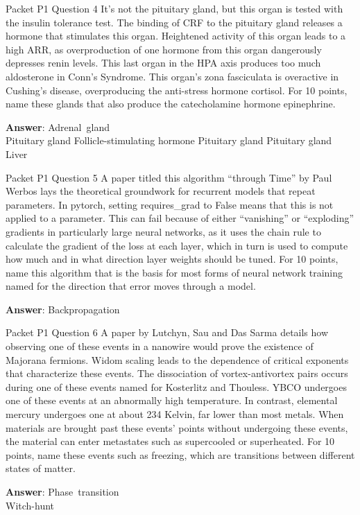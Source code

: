 \begin{frame}{Packet P1 Question 4}
It's not the pituitary gland, but this organ     is tested with the insulin tolerance test. The binding of CRF to the pituitary gland releases a hormone that stimulates this organ. Heightened activity of this organ leads to a high ARR, as overproduction of one hormone from this organ dangerously   depresses renin levels. This last organ in the HPA axis produces too much aldosterone in Conn's Syndrome. This organ's zona fasciculata   is overactive in Cushing’s disease,   overproducing the anti-stress hormone cortisol. For 10 points, name these glands that also produce the catecholamine hormone epinephrine.    

\textbf{Answer}: Adrenal\ gland\\
 Pituitary gland
 Follicle-stimulating hormone
 Pituitary gland
 Pituitary gland
 Liver
\end{frame}

\begin{frame}{Packet P1 Question 5}
A paper titled this algorithm ``through Time'' by Paul Werbos lays the theoretical groundwork for recurrent models that repeat parameters.  In pytorch, setting requires\_grad to False means that this is not applied to a parameter.  This can fail because of either ``vanishing'' or ``exploding'' gradients in particularly large neural networks, as it uses the chain rule to calculate the gradient of the loss at each layer, which     in turn is used to compute how much and in what direction layer weights should be   tuned. For 10 points, name this algorithm   that is the basis for most forms of neural network training named for the direction that error moves through a model.

\textbf{Answer}: Backpropagation\\
\end{frame}

\begin{frame}{Packet P1 Question 6}
A paper by Lutchyn, Sau and Das Sarma details how observing one of these events in a nanowire would prove the existence of Majorana fermions. Widom scaling leads to the dependence of critical exponents   that characterize these events. The dissociation of vortex-antivortex pairs occurs during one of these events named for Kosterlitz and Thouless.     YBCO undergoes one of these events at an abnormally high temperature. In contrast, elemental mercury undergoes one at about 234 Kelvin, far lower than most metals. When materials are brought past these events' points without undergoing these events, the material can enter metastates such as supercooled or superheated. For 10 points, name these events such as freezing, which are transitions between different states of matter.  

\textbf{Answer}: Phase\ transition\\
 Witch-hunt
\end{frame}

